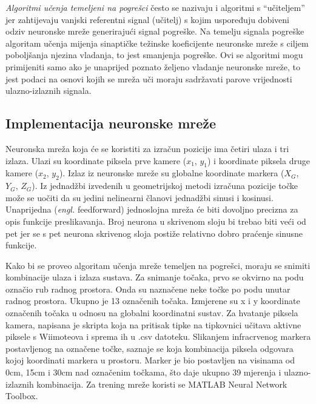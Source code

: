 \documentclass[times, utf8, diplomski]{fer}
\begin{document}
\textit{Algoritmi učenja temeljeni na pogrešci} često se nazivaju i algoritmi s “učiteljem” jer zahtijevaju vanjski referentni signal (učitelj) s kojim uspoređuju dobiveni odziv neuronske mreže generirajući signal pogreške. Na temelju signala pogreške algoritam učenja mijenja sinaptičke težinske koeficijente neuronske mreže s ciljem poboljšanja njezina vladanja, to jest smanjenja pogreške. Ovi se algoritmi mogu primijeniti samo ako je unaprijed poznato željeno vladanje neuronske mreže, to jest podaci na osnovi kojih se mreža uči moraju sadržavati parove vrijednosti ulazno-izlaznih signala.

\subsection{Implementacija neuronske mreže}
Neuronska mreža koja će se koristiti za izračun pozicije ima četiri ulaza i tri izlaza. Ulazi su koordinate piksela prve kamere ($x_1$, $y_1$) i koordinate piksela druge kamere ($x_2$, $y_2$). Izlaz iz neuronske mreže su globalne koordinate markera ($X_G$, $Y_G$, $Z_G$). Iz jednadžbi izvedenih u geometrijskoj metodi izračuna pozicije točke može se uočiti da su jedini nelinearni članovi jednadžbi sinusi i kosinusi. Unaprijedna (\textit{engl.} feedforward) jednoslojna mreža će biti dovoljno precizna za opis funkcije preslikavanja. Broj neurona u skrivenom sloju bi trebao biti veći od pet jer se s pet neurona skrivenog sloja postiže relativno dobro praćenje sinusne funkcije.

Kako bi se proveo algoritam učenja mreže temeljen na pogrešci, moraju se snimiti kombinacije ulaza i izlaza sustava. Za snimanje točaka, prvo se okvirno na podu označio rub radnog prostora. Onda su naznačene neke točke po podu unutar radnog prostora. Ukupno je 13  označenih točaka. Izmjerene su x i y koordinate označenih točaka u odnosu na globalni koordinatni sustav. Za hvatanje piksela kamera, napisana je skripta koja na pritisak tipke na tipkovnici učitava aktivne piksele s Wiimoteova i sprema ih u .csv datoteku. Slikanjem infracrvenog markera postavljenog na označene točke, saznaje se koja kombinacija piksela odgovara kojoj koordinati markera u prostoru. Marker je bio postavljen na visinama od 0cm, 15cm i 30cm nad označenim točkama, što daje ukupno 39 mjerenja i ulazno-izlaznih kombinacija. Za trening mreže koristi se MATLAB Neural Network Toolbox.
\end{document}

